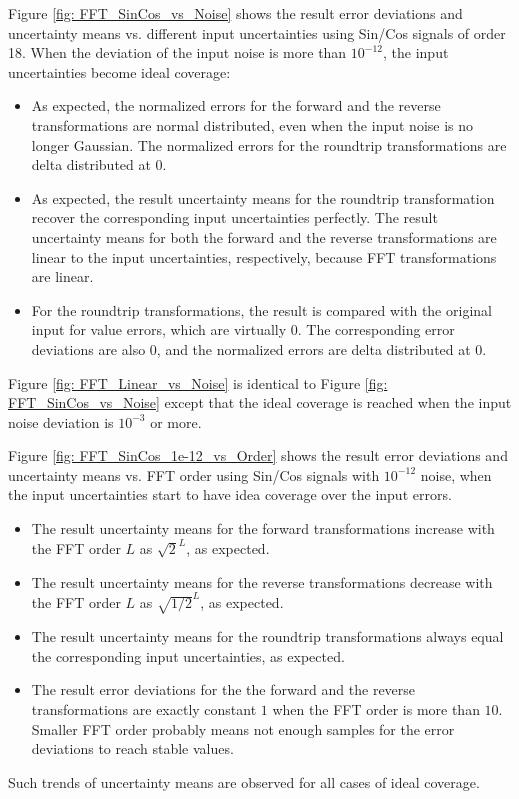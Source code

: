\documentclass[twoside]{article}
\numberwithin{equation}{section}
\begin{document}
Figure \ref{fig:  FFT_SinCos_vs_Noise}  shows the result error deviations and uncertainty means vs. different input uncertainties using Sin/Cos signals of order 18.  
When the deviation of the input noise is more than $10^{-12}$, the input uncertainties become ideal coverage:
\begin{itemize}
\item As expected, the normalized errors for the forward and the reverse transformations are normal distributed, even when the input noise is no longer Gaussian.
The normalized errors for the roundtrip transformations are delta distributed at $0$.

\item As expected, the result uncertainty means for the roundtrip transformation recover the corresponding input uncertainties perfectly. 
The result uncertainty means for both the forward and the reverse transformations are linear to the input uncertainties, respectively, because FFT transformations are linear.

\item For the roundtrip transformations, the result is compared with the original input for value errors, which are virtually $0$.
The corresponding error deviations are also $0$, and the normalized errors are delta distributed at $0$.

\end{itemize}
Figure \ref{fig: FFT_Linear_vs_Noise} is identical to Figure \ref{fig: FFT_SinCos_vs_Noise} except that the ideal coverage is reached when the input noise deviation is $10^{-3}$ or more.

Figure \ref{fig:  FFT_SinCos_1e-12_vs_Order}  shows the result error deviations and uncertainty means vs. FFT order using Sin/Cos signals with $10^{-12}$ noise, when the input uncertainties start to have idea coverage over the input errors.
\begin{itemize}
\item The result uncertainty means for the forward transformations increase with the FFT order $L$ as $\sqrt{2}^L$, as expected.

\item The result uncertainty means for the reverse transformations decrease with the FFT order $L$ as $\sqrt{1/2}^L$, as expected.

\item The result uncertainty means for the roundtrip transformations always equal the corresponding input uncertainties, as expected.

\item The result error deviations for the the forward and the reverse transformations are exactly constant $1$ when the FFT order is more than $10$.
Smaller FFT order probably means not enough samples for the error deviations to reach stable values.
\end{itemize}
Such trends of uncertainty means are observed for all cases of ideal coverage.
\end{document}
